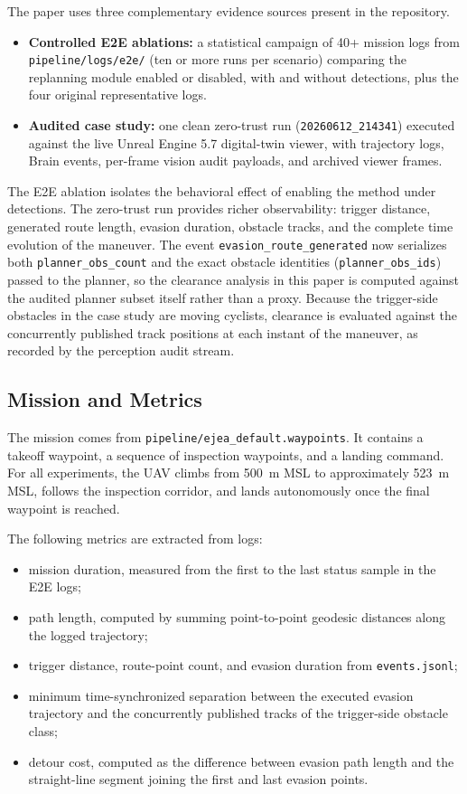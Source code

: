 \documentclass[a4paper,11pt]{article}
\begin{document}
The paper uses three complementary evidence sources present in the repository.
\begin{itemize}[leftmargin=1.3em]
    \item \textbf{Controlled E2E ablations:} a statistical campaign of 40+ mission logs from \texttt{pipeline/logs/e2e/} (ten or more runs per scenario) comparing the replanning module enabled or disabled, with and without detections, plus the four original representative logs.
    \item \textbf{Audited case study:} one clean zero-trust run (\texttt{20260612\_214341}) executed against the live Unreal Engine 5.7 digital-twin viewer, with trajectory logs, Brain events, per-frame vision audit payloads, and archived viewer frames.
\end{itemize}

The E2E ablation isolates the behavioral effect of enabling the method under detections. The zero-trust run provides richer observability: trigger distance, generated route length, evasion duration, obstacle tracks, and the complete time evolution of the maneuver. The event \texttt{evasion\_route\_generated} now serializes both \texttt{planner\_obs\_count} and the exact obstacle identities (\texttt{planner\_obs\_ids}) passed to the planner, so the clearance analysis in this paper is computed against the audited planner subset itself rather than a proxy. Because the trigger-side obstacles in the case study are moving cyclists, clearance is evaluated against the concurrently published track positions at each instant of the maneuver, as recorded by the perception audit stream.

\subsection{Mission and Metrics}

The mission comes from \texttt{pipeline/ejea\_default.waypoints}. It contains a takeoff waypoint, a sequence of inspection waypoints, and a landing command. For all experiments, the UAV climbs from \SI{500}{\meter} MSL to approximately \SI{523}{\meter} MSL, follows the inspection corridor, and lands autonomously once the final waypoint is reached.

The following metrics are extracted from logs:
\begin{itemize}[leftmargin=1.3em]
    \item mission duration, measured from the first to the last status sample in the E2E logs;
    \item path length, computed by summing point-to-point geodesic distances along the logged trajectory;
    \item trigger distance, route-point count, and evasion duration from \texttt{events.jsonl};
    \item minimum time-synchronized separation between the executed evasion trajectory and the concurrently published tracks of the trigger-side obstacle class;
    \item detour cost, computed as the difference between evasion path length and the straight-line segment joining the first and last evasion points.
\end{itemize}
\end{document}
